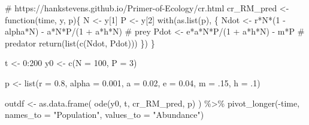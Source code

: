 \documentclass[
  letterpaper,
  DIV=11,
  numbers=noendperiod]{scrartcl}
\newenvironment{Shaded}{\begin{snugshade}}{\end{snugshade}}
\newcommand{\AttributeTok}[1]{\textcolor[rgb]{0.40,0.45,0.13}{#1}}
\newcommand{\CommentTok}[1]{\textcolor[rgb]{0.37,0.37,0.37}{#1}}
\newcommand{\ControlFlowTok}[1]{\textcolor[rgb]{0.00,0.23,0.31}{#1}}
\newcommand{\DecValTok}[1]{\textcolor[rgb]{0.68,0.00,0.00}{#1}}
\newcommand{\FloatTok}[1]{\textcolor[rgb]{0.68,0.00,0.00}{#1}}
\newcommand{\FunctionTok}[1]{\textcolor[rgb]{0.28,0.35,0.67}{#1}}
\newcommand{\NormalTok}[1]{\textcolor[rgb]{0.00,0.23,0.31}{#1}}
\newcommand{\OtherTok}[1]{\textcolor[rgb]{0.00,0.23,0.31}{#1}}
\newcommand{\SpecialCharTok}[1]{\textcolor[rgb]{0.37,0.37,0.37}{#1}}
\newcommand{\StringTok}[1]{\textcolor[rgb]{0.13,0.47,0.30}{#1}}
\begin{document}
\begin{Shaded}
\begin{Highlighting}[]
\CommentTok{\# https://hankstevens.github.io/Primer{-}of{-}Ecology/cr.html}
\NormalTok{cr\_RM\_pred }\OtherTok{\textless{}{-}} \ControlFlowTok{function}\NormalTok{(time, y, p)\{}
\NormalTok{  N }\OtherTok{\textless{}{-}}\NormalTok{ y[}\DecValTok{1}\NormalTok{]}
\NormalTok{  P }\OtherTok{\textless{}{-}}\NormalTok{ y[}\DecValTok{2}\NormalTok{]}
  \FunctionTok{with}\NormalTok{(}\FunctionTok{as.list}\NormalTok{(p), \{}
\NormalTok{    Ndot }\OtherTok{\textless{}{-}}\NormalTok{ r}\SpecialCharTok{*}\NormalTok{N}\SpecialCharTok{*}\NormalTok{(}\DecValTok{1} \SpecialCharTok{{-}}\NormalTok{ alpha}\SpecialCharTok{*}\NormalTok{N) }\SpecialCharTok{{-}}\NormalTok{ a}\SpecialCharTok{*}\NormalTok{N}\SpecialCharTok{*}\NormalTok{P}\SpecialCharTok{/}\NormalTok{(}\DecValTok{1} \SpecialCharTok{+}\NormalTok{ a}\SpecialCharTok{*}\NormalTok{h}\SpecialCharTok{*}\NormalTok{N) }\CommentTok{\# prey}
\NormalTok{    Pdot }\OtherTok{\textless{}{-}}\NormalTok{ e}\SpecialCharTok{*}\NormalTok{a}\SpecialCharTok{*}\NormalTok{N}\SpecialCharTok{*}\NormalTok{P}\SpecialCharTok{/}\NormalTok{(}\DecValTok{1} \SpecialCharTok{+}\NormalTok{ a}\SpecialCharTok{*}\NormalTok{h}\SpecialCharTok{*}\NormalTok{N) }\SpecialCharTok{{-}}\NormalTok{ m}\SpecialCharTok{*}\NormalTok{P }\CommentTok{\# predator}
    \FunctionTok{return}\NormalTok{(}\FunctionTok{list}\NormalTok{(}\FunctionTok{c}\NormalTok{(Ndot, Pdot)))}
\NormalTok{  \})}
\NormalTok{\}}

\NormalTok{t }\OtherTok{\textless{}{-}} \DecValTok{0}\SpecialCharTok{:}\DecValTok{200}
\NormalTok{y0 }\OtherTok{\textless{}{-}} \FunctionTok{c}\NormalTok{(}\AttributeTok{N =} \DecValTok{100}\NormalTok{, }\AttributeTok{P =} \DecValTok{3}\NormalTok{)}

\NormalTok{p }\OtherTok{\textless{}{-}} \FunctionTok{list}\NormalTok{(}\AttributeTok{r =} \FloatTok{0.8}\NormalTok{, }\AttributeTok{alpha =} \FloatTok{0.001}\NormalTok{, }\AttributeTok{a =} \FloatTok{0.02}\NormalTok{, }\AttributeTok{e =} \FloatTok{0.04}\NormalTok{, }\AttributeTok{m =}\NormalTok{ .}\DecValTok{15}\NormalTok{, }\AttributeTok{h =}\NormalTok{ .}\DecValTok{1}\NormalTok{)}

\NormalTok{outdf }\OtherTok{\textless{}{-}} \FunctionTok{as.data.frame}\NormalTok{( }\FunctionTok{ode}\NormalTok{(y0, t, cr\_RM\_pred,  p) ) }\SpecialCharTok{\%\textgreater{}\%}
  \FunctionTok{pivot\_longer}\NormalTok{(}\SpecialCharTok{{-}}\NormalTok{time, }\AttributeTok{names\_to =} \StringTok{"Population"}\NormalTok{, }\AttributeTok{values\_to =} \StringTok{"Abundance"}\NormalTok{)}
\end{Highlighting}
\end{Shaded}
\end{document}
